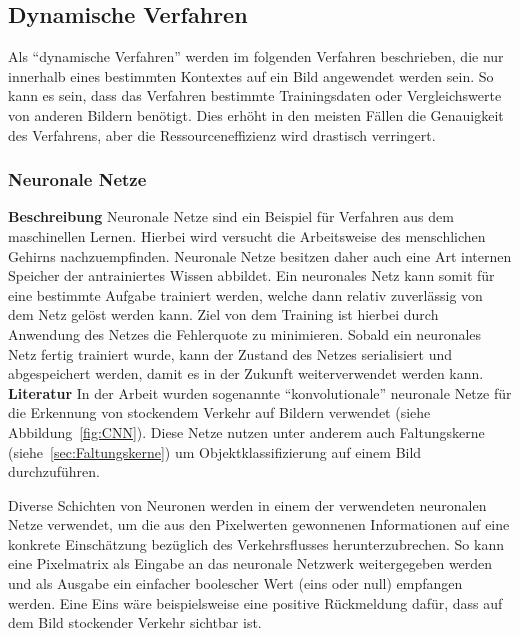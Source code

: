 \subsection{Dynamische Verfahren}
Als "`dynamische Verfahren"' werden im folgenden Verfahren beschrieben, die nur innerhalb eines bestimmten Kontextes auf ein Bild angewendet werden sein. So kann es sein, dass das Verfahren bestimmte Trainingsdaten oder Vergleichswerte von anderen Bildern benötigt. Dies erhöht in den meisten Fällen die Genauigkeit des Verfahrens, aber die Ressourceneffizienz wird drastisch verringert.
\subsubsection{Neuronale Netze}
\textbf{Beschreibung}\newline
Neuronale Netze sind ein Beispiel für Verfahren aus dem maschinellen Lernen.
Hierbei wird versucht die Arbeitsweise des menschlichen Gehirns nachzuempfinden.
Neuronale Netze besitzen daher auch eine Art internen Speicher der antrainiertes Wissen abbildet.
Ein neuronales Netz kann somit für eine bestimmte Aufgabe trainiert werden, welche dann relativ zuverlässig von dem Netz gelöst werden kann.
Ziel von dem Training ist hierbei durch Anwendung des Netzes die Fehlerquote zu minimieren.
Sobald ein neuronales Netz fertig trainiert wurde, kann der Zustand des Netzes serialisiert und abgespeichert werden, damit es in der Zukunft weiterverwendet werden kann.
\newline\newline
\textbf{Literatur}\newline
In der Arbeit \cite{hkkDhbw} wurden sogenannte "`konvolutionale"' neuronale Netze für die Erkennung von stockendem Verkehr auf Bildern verwendet (siehe Abbildung~\ref{fig:CNN}).
Diese Netze nutzen unter anderem auch Faltungskerne (siehe~\ref{sec:Faltungskerne}) um Objektklassifizierung auf einem Bild durchzuführen.

Diverse Schichten von Neuronen werden in einem der verwendeten neuronalen Netze verwendet, um die aus den Pixelwerten gewonnenen Informationen auf eine konkrete Einschätzung bezüglich des Verkehrsflusses herunterzubrechen.
So kann eine Pixelmatrix als Eingabe an das neuronale Netzwerk weitergegeben werden und als Ausgabe ein einfacher boolescher Wert (eins oder null) empfangen werden. 
Eine Eins wäre beispielsweise eine positive Rückmeldung dafür, dass auf dem Bild stockender Verkehr sichtbar ist.

